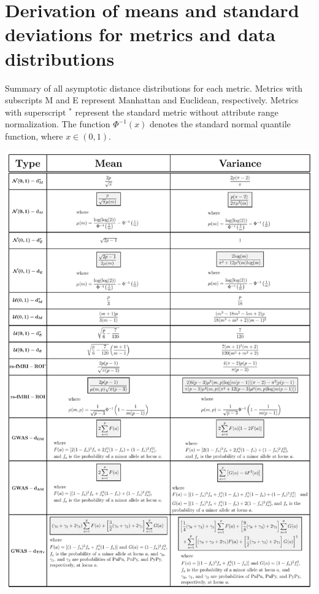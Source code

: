 \documentclass[10pt,letterpaper]{article}\usepackage[]{graphicx}\usepackage[]{color}
\begin{document}
\section{Derivation of means and standard deviations for metrics and data distributions}

\begin{table}[H]
\caption{Summary of all asymptotic distance distributions for each metric. Metrics with subscripts M and E represent Manhattan and Euclidean, respectively. Metrics with superscript $^*$ represent the standard metric without attribute range normalization. The function $\Phi^{-1}(x)$ denotes the standard normal quantile function, where $x \in (0,1)$.}
\label{tab:dist_distr}
\centering
\includegraphics[clip, trim=0.15cm 0.15cm 0.15cm 0.15cm,width=\textwidth]{distributions_table.pdf}
\end{table}
\end{document}
